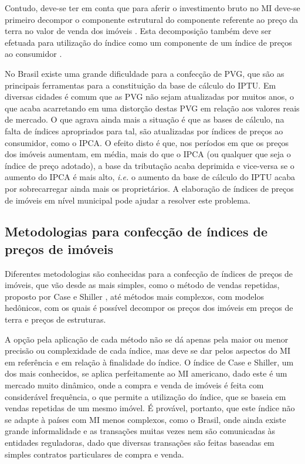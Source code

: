 \documentclass[
	12pt,				%
	oneside,			%
	a4paper,			%
	chapter=TITLE,		%
	section=TITLE,		%
	english,			%
	brazil				%
	]{abntex2}
\begin{document}
\begin{refsection}
Contudo, deve-se ter em conta que para aferir o investimento bruto no \gls{MI}
deve-se primeiro decompor o componente estrutural do componente
referente ao preço da terra no valor de venda dos imóveis \autocite[155]{rppi}. Esta
decomposição também deve ser efetuada para utilização do índice como um
componente de um índice de preços ao consumidor \autocite[156]{rppi}.

No Brasil existe uma grande dificuldade para a confecção de \gls{PVG}, que são
as principais ferramentas para a constituição da base de cálculo do \gls{IPTU}.
Em diversas cidades é comum que as \gls{PVG} não sejam atualizadas por muitos
anos, o que acaba acarretando em uma distorção destas \gls{PVG} em relação aos
valores reais de mercado. O que agrava ainda mais a situação é que as bases de
cálculo, na falta de índices apropriados para tal, são atualizadas por índices
de preços ao consumidor, como o \gls{IPCA}. O efeito disto é que, nos períodos
em que os preços dos imóveis aumentam, em média, mais do que o \gls{IPCA} (ou
qualquer que seja o índice de preço adotado), a base da tributação acaba
deprimida e vice-versa se o aumento do \gls{IPCA} é mais alto, \emph{i.e.} o aumento
da base de cálculo do \gls{IPTU} acaba por sobrecarregar ainda mais os
proprietários. A elaboração de índices de preços de imóveis em nível municipal
pode ajudar a resolver este problema.

\hypertarget{metodologias-para-confecuxe7uxe3o-de-uxedndices-de-preuxe7os-de-imuxf3veis}{%
\subsection{Metodologias para confecção de índices de preços de imóveis}\label{metodologias-para-confecuxe7uxe3o-de-uxedndices-de-preuxe7os-de-imuxf3veis}}

Diferentes metodologias são conhecidas para a confecção de índices de preços de
imóveis, que vão desde as mais simples, como o método de vendas repetidas,
proposto por Case e Shiller \autocite*{repeatedSales}, até métodos mais complexos, com
modelos hedônicos, com os quais é possível decompor os preços dos imóveis em
preços de terra e preços de estruturas.

A opção pela aplicação de cada método não se dá apenas pela maior ou menor
precisão ou complexidade de cada índice, mas deve se dar pelos aspectos do
\gls{MI} em referência e em relação à finalidade do índice. O índice de Case e
Shiller, um dos mais conhecidos, se aplica perfeitamente ao \gls{MI} americano,
dado este é um mercado muito dinâmico, onde a compra e venda de imóveis é feita
com considerável frequência, o que permite a utilização do índice, que se baseia
em vendas repetidas de um mesmo imóvel. É provável, portanto, que este índice
não se adapte à países com \gls{MI} menos complexos, como o Brasil, onde ainda
existe grande informalidade e as transações muitas vezes nem são comunicadas às
entidades reguladoras, dado que diversas transações são feitas baseadas em
simples contratos particulares de compra e venda.


\end{refsection}
\end{document}
